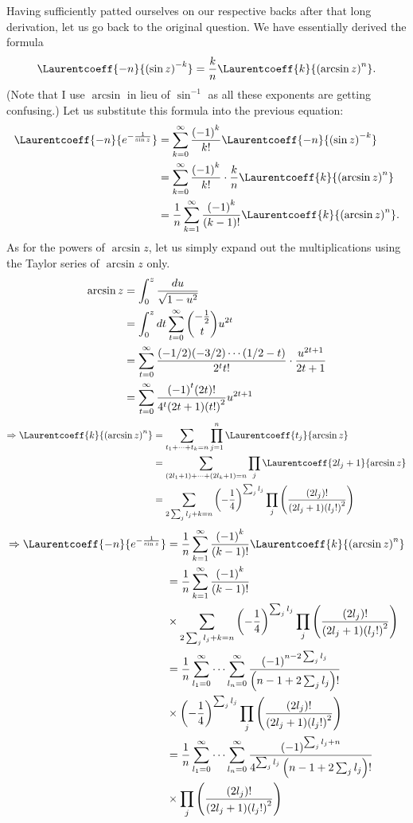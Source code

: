 Having sufficiently patted ourselves on our respective backs after that long derivation,
let us go back to the original question.
We have essentially derived the formula
\[
    \Laurentcoeff{-n}{{(\sin z)}^{-k}} = \frac{k}{n} \Laurentcoeff{k}{{(\arcsin z)}^n}.
\]
(Note that I use $\arcsin$ in lieu of $\sin^{-1}$ as all these exponents are getting confusing.)
Let us substitute this formula into the previous equation:
\begin{align*}
    \Laurentcoeff{-n}{e^{-\inv{\sin z}}}
    &= \sum_{k=0}^\infty \frac{{(-1)}^k}{k!} \Laurentcoeff{-n}{{(\sin z)}^{-k}} \\
    &= \sum_{k=0}^\infty \frac{{(-1)}^k}{k!} \cdot \frac{k}{n} \Laurentcoeff{k}{{(\arcsin z)}^n} \\
    &= \inv{n} \sum_{k=1}^\infty \frac{{(-1)}^k}{(k-1)!} \Laurentcoeff{k}{{(\arcsin z)}^n}.
\end{align*}
As for the powers of $\arcsin z$, let us simply expand out the multiplications
using the Taylor series of $\arcsin z$ only.
\begin{align*}
    \arcsin z
    &= \int_0^z \frac{du}{\sqrt{1 - u^2}} \\
    &= \int_0^z dt \sum_{t=0}^\infty \binom{-\frac{1}{2}}{t} u^{2t} \\
    &= \sum_{t=0}^\infty \frac{(-1/2) (-3/2) \cdots (1/2 - t)}{2^t t!} \cdot \frac{u^{2t + 1}}{2t + 1} \\
    &= \sum_{t=0}^\infty \frac{{(-1)}^t (2t)!}{4^t (2t+1) {(t!)}^2} u^{2t + 1}
\end{align*}
\begin{align*}
    \Rightarrow \Laurentcoeff{k}{{(\arcsin z)}^n}
    &= \sum_{t_1 + \cdots + t_k = n} \prod_{j=1}^n \Laurentcoeff{t_j}{\arcsin z} \\
    &= \sum_{(2l_1 + 1) + \cdots + (2l_k + 1) = n} \prod_j \Laurentcoeff{2l_j + 1}{\arcsin z} \\
    &= \sum_{2\sum_j l_j + k = n} {\left( -\inv{4} \right)}^{\sum_j l_j}
       \prod_j \left( \frac{(2l_j)!}{(2l_j + 1) {(l_j !)}^2} \right)
\end{align*}
\begin{align*}
    \Rightarrow \Laurentcoeff{-n}{e^{-\inv{\sin z}}}
    &= \inv{n} \sum_{k=1}^\infty \frac{{(-1)}^k}{(k-1)!} \Laurentcoeff{k}{{(\arcsin z)}^n} \\
    &= \inv{n} \sum_{k=1}^\infty \frac{{(-1)}^k}{(k-1)!} \\
    &\times \sum_{2\sum_j l_j + k = n} {\left( -\inv{4} \right)}^{\sum_j l_j}
            \prod_j \left( \frac{(2l_j)!}{(2l_j + 1) {(l_j !)}^2} \right) \\
    &= \inv{n} \sum_{l_1=0}^\infty \cdots \sum_{l_n=0}^\infty
       \frac{{(-1)}^{n - 2\sum_j l_j}}{\left( n - 1 + 2\sum_j l_j \right)!} \\
    &\times {\left( -\inv{4} \right)}^{\sum_j l_j}
            \prod_j \left( \frac{(2l_j)!}{(2l_j + 1) {(l_j !)}^2} \right) \\
    &= \inv{n} \sum_{l_1=0}^\infty \cdots \sum_{l_n=0}^\infty
       \frac{{(-1)}^{\sum_j l_j + n}}{4^{\sum_j l_j} \left( n - 1 + 2\sum_j l_j \right)!} \\
    &\times \prod_j \left( \frac{(2l_j)!}{(2l_j + 1) {(l_j !)}^2} \right)
\end{align*}

